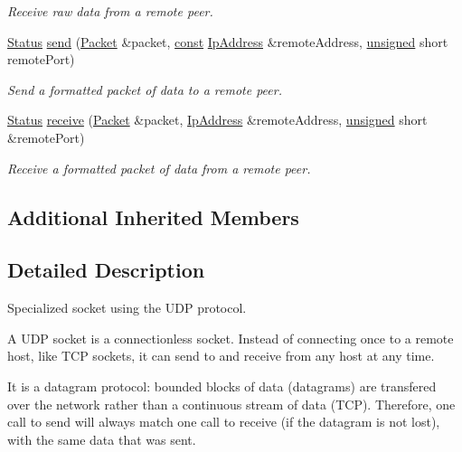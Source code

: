 \begin{DoxyCompactItemize}
\begin{DoxyCompactList}\small\item\em Receive raw data from a remote peer. \end{DoxyCompactList}\item 
\hyperlink{classsf_1_1_socket_a51bf0fd51057b98a10fbb866246176dc}{Status} \hyperlink{classsf_1_1_udp_socket_a48969a62c80d40fd74293a740798e435}{send} (\hyperlink{classsf_1_1_packet}{Packet} \&packet, \hyperlink{term__entry_8h_a57bd63ce7f9a353488880e3de6692d5a}{const} \hyperlink{classsf_1_1_ip_address}{Ip\-Address} \&remote\-Address, \hyperlink{curses_8priv_8h_aca40206900cfc164654362fa8d4ad1e6}{unsigned} short remote\-Port)
\begin{DoxyCompactList}\small\item\em Send a formatted packet of data to a remote peer. \end{DoxyCompactList}\item 
\hyperlink{classsf_1_1_socket_a51bf0fd51057b98a10fbb866246176dc}{Status} \hyperlink{classsf_1_1_udp_socket_afdd5c655d00c96222d5b477fc057a22b}{receive} (\hyperlink{classsf_1_1_packet}{Packet} \&packet, \hyperlink{classsf_1_1_ip_address}{Ip\-Address} \&remote\-Address, \hyperlink{curses_8priv_8h_aca40206900cfc164654362fa8d4ad1e6}{unsigned} short \&remote\-Port)
\begin{DoxyCompactList}\small\item\em Receive a formatted packet of data from a remote peer. \end{DoxyCompactList}\end{DoxyCompactItemize}
\subsection*{Additional Inherited Members}


\subsection{Detailed Description}
Specialized socket using the U\-D\-P protocol. 

A U\-D\-P socket is a connectionless socket. Instead of connecting once to a remote host, like T\-C\-P sockets, it can send to and receive from any host at any time.

It is a datagram protocol\-: bounded blocks of data (datagrams) are transfered over the network rather than a continuous stream of data (T\-C\-P). Therefore, one call to send will always match one call to receive (if the datagram is not lost), with the same data that was sent.

